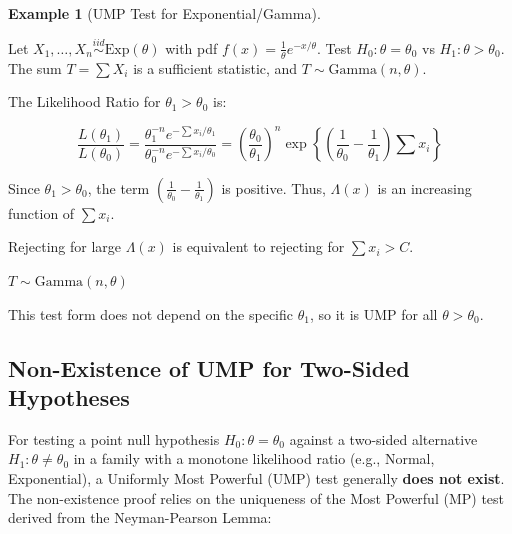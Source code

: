 \documentclass[
  letterpaper,
  DIV=11,
  numbers=noendperiod]{scrreprt}
\renewcommand{\[}{\begin{equation}}
\renewcommand{\]}{\end{equation}}
\theoremstyle{definition}
\theoremstyle{plain}
\theoremstyle{plain}
\theoremstyle{plain}
\theoremstyle{definition}
\newtheorem{example}{Example}[chapter]
\theoremstyle{plain}
\theoremstyle{remark}
\begin{document}
\begin{example}[UMP Test for
Exponential/Gamma]\protect\hypertarget{exm-ump-gamma}{}\label{exm-ump-gamma}

Let \(X_1, \dots, X_n \overset{iid}{\sim} \text{Exp}(\theta)\) with pdf
\(f(x) = \frac{1}{\theta} e^{-x/\theta}\). Test
\(H_0: \theta = \theta_0\) vs \(H_1: \theta > \theta_0\). The sum
\(T = \sum X_i\) is a sufficient statistic, and
\(T \sim \text{Gamma}(n, \theta)\).

The Likelihood Ratio for \(\theta_1 > \theta_0\) is:

\[
\frac{L(\theta_1)}{L(\theta_0)} = \frac{\theta_1^{-n} e^{-\sum x_i / \theta_1}}{\theta_0^{-n} e^{-\sum x_i / \theta_0}} = \left(\frac{\theta_0}{\theta_1}\right)^n \exp \left\{ \left( \frac{1}{\theta_0} - \frac{1}{\theta_1} \right) \sum x_i \right\}
\]

Since \(\theta_1 > \theta_0\), the term
\((\frac{1}{\theta_0} - \frac{1}{\theta_1})\) is positive. Thus,
\(\Lambda(x)\) is an increasing function of \(\sum x_i\).

Rejecting for large \(\Lambda(x)\) is equivalent to rejecting for
\(\sum x_i > C\).

\(T \sim \text{Gamma}(n, \theta)\)

This test form does not depend on the specific \(\theta_1\), so it is
UMP for all \(\theta > \theta_0\).

\end{example}

\subsection{Non-Existence of UMP for Two-Sided
Hypotheses}\label{non-existence-of-ump-for-two-sided-hypotheses}

For testing a point null hypothesis \(H_0: \theta = \theta_0\) against a
two-sided alternative \(H_1: \theta \neq \theta_0\) in a family with a
monotone likelihood ratio (e.g., Normal, Exponential), a Uniformly Most
Powerful (UMP) test generally \textbf{does not exist}. The non-existence
proof relies on the uniqueness of the Most Powerful (MP) test derived
from the Neyman-Pearson Lemma:
\end{document}

